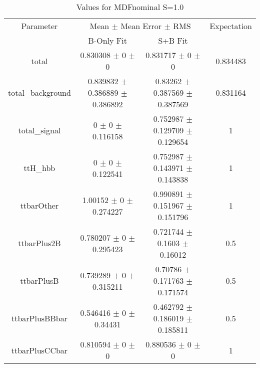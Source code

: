 \begin{table}
\centering
\caption{Values for MDFnominal S=1.0}
\begin{tabular}{cccc}
\toprule
Parameter & \multicolumn{2}{c}{Mean $\pm$ Mean Error $\pm$ RMS} & Expectation\\
 & B-Only Fit & S+B Fit & \\
\midrule
total & \num{0.830308} $\pm$ \num{0} $\pm$ \num{0} & \num{0.831717} $\pm$ \num{0} $\pm$ \num{0} & \num{0.834483}\\
total\_background & \num{0.839832} $\pm$ \num{0.386889} $\pm$ \num{0.386892} & \num{0.83262} $\pm$ \num{0.387569} $\pm$ \num{0.387569} & \num{0.831164}\\
total\_signal & \num{0} $\pm$ \num{0} $\pm$ \num{0.116158} & \num{0.752987} $\pm$ \num{0.129709} $\pm$ \num{0.129654} & \num{1}\\
ttH\_hbb & \num{0} $\pm$ \num{0} $\pm$ \num{0.122541} & \num{0.752987} $\pm$ \num{0.143971} $\pm$ \num{0.143838} & \num{1}\\
ttbarOther & \num{1.00152} $\pm$ \num{0} $\pm$ \num{0.274227} & \num{0.990891} $\pm$ \num{0.151967} $\pm$ \num{0.151796} & \num{1}\\
ttbarPlus2B & \num{0.780207} $\pm$ \num{0} $\pm$ \num{0.295423} & \num{0.721744} $\pm$ \num{0.1603} $\pm$ \num{0.16012} & \num{0.5}\\
ttbarPlusB & \num{0.739289} $\pm$ \num{0} $\pm$ \num{0.315211} & \num{0.70786} $\pm$ \num{0.171763} $\pm$ \num{0.171574} & \num{0.5}\\
ttbarPlusBBbar & \num{0.546416} $\pm$ \num{0} $\pm$ \num{0.34431} & \num{0.462792} $\pm$ \num{0.186019} $\pm$ \num{0.185811} & \num{0.5}\\
ttbarPlusCCbar & \num{0.810594} $\pm$ \num{0} $\pm$ \num{0} & \num{0.880536} $\pm$ \num{0} $\pm$ \num{0} & \num{1}\\
\bottomrule
\end{tabular}
\end{table}
